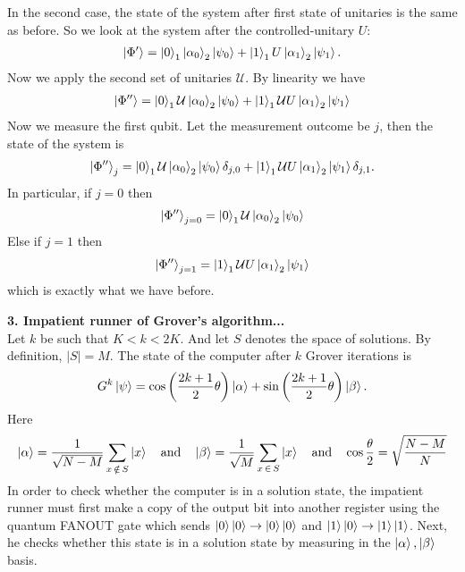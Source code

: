\documentclass{article}
\theoremstyle{definition}
\newcommand{\al}{\alpha}
\newcommand{\be}{\beta}
\newcommand{\f}[2]{\frac{#1}{#2}}
\newcommand{\lp}{\left(}
\newcommand{\rp}{\right)}
\begin{document}
In the second case, the state of the system after first state of unitaries is the same as before. So we look at the  system after the controlled-unitary $U$:
\begin{align*}
	\ket{\Phi'} =  \ket{0}_1 \ket{\al_0}_2 \ket{\psi_0} + \ket{1}_1 U \ket{\al_1}_2\ket{\psi_1}.
\end{align*}
Now we apply the second set of unitaries $\mathcal{U}$. By linearity we have
\begin{align*}
		\ket{\Phi''} = \ket{0}_1 \mathcal{U} \ket{\al_0}_2 \ket{\psi_0} + \ket{1}_1 \mathcal{U} U \ket{\al_1}_2\ket{\psi_1}
\end{align*}
Now we measure the first qubit. Let the measurement outcome be $j$, then the state of the system is 
\begin{align*}
	\ket{\Phi''}_{j} = \ket{0}_1 \mathcal{U} \ket{\al_0}_2 \ket{\psi_0} \delta_{j,0} + \ket{1}_1 \mathcal{U} U \ket{\al_1}_2\ket{\psi_1} \delta_{j,1}.
\end{align*}
In particular, if $j=0$ then 
\begin{align*}
		\ket{\Phi''}_{j=0} = \ket{0}_1 \mathcal{U} \ket{\al_0}_2 \ket{\psi_0}
\end{align*}
Else if $j=1$ then
\begin{align*}
	\ket{\Phi''}_{j=1} = \ket{1}_1 \mathcal{U} U \ket{\al_1}_2 \ket{\psi_1}
\end{align*}
which is exactly what we have before. 

\newpage

\noindent \textbf{3. Impatient runner of Grover's algorithm...}\\

\noindent Let $k$ be such that $K < k < 2K$. And let $S$ denotes the space of solutions. By definition, $|S| = M$. The state of the computer after $k$ Grover iterations is
\begin{align*}
	G^k \ket{\psi} = \cos\lp \f{2k+1}{2}\theta \rp \ket{\al} + \sin\lp \f{2k+1}{2}\theta \rp \ket{\be}.
\end{align*}
Here
\begin{align*}
	\ket{\al} = \f{1}{\sqrt{N-M}} \sum_{x \,\notin\, S} \ket{x} 
	\quad \text{and} \quad
	\ket{\be} = \f{1}{\sqrt{M}} \sum_{x \,\in\, S } \ket{x} 
	\quad \text{and} \quad \cos\f{\theta}{2} = \sqrt{\f{N-M}{N}}
\end{align*}
In order to check whether the computer is in a solution state, the impatient runner must first make a copy of the output bit into another register using the quantum FANOUT gate which sends $\ket{0}\ket{0} \to \ket{0}\ket{0}$ and $\ket{1}\ket{0} \to \ket{1}\ket{1}$. Next, he checks whether this state is in a solution state by measuring in the $\ket{\al}, \ket{\be}$ basis. 
\end{document}
